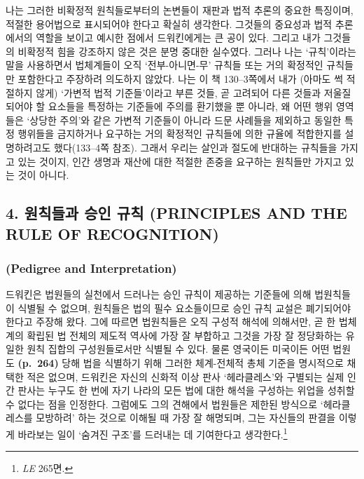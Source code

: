 나는 그러한 비확정적 원칙들로부터의 논변들이 재판과 법적 추론의 중요한
특징이며, 적절한 용어법으로 표시되어야 한다고 확실히 생각한다. 그것들의
중요성과 법적 추론에서의 역할을 보이고 예시한 점에서 드워킨에게는 큰
공이 있다. 그리고 내가 그것들의 비확정적 힘을 강조하지 않은 것은 분명
중대한 실수였다. 그러나 나는 ‘규칙’이라는 말을 사용하면서 법체계들이
오직 ‘전부-아니면-무’ 규칙들 또는 거의 확정적인 규칙들만 포함한다고
주장하려 의도하지 않았다. 나는 이 책 130--3쪽에서 내가 (아마도 썩
적절하지 않게) ‘가변적 법적 기준들’이라고 부른 것들, 곧 고려되어 다른
것들과 저울질되어야 할 요소들을 특정하는 기준들에 주의를 환기했을 뿐
아니라, 왜 어떤 행위 영역들은 ‘상당한 주의’와 같은 가변적 기준들이
아니라 드문 사례들을 제외하고 동일한 특정 행위들을 금지하거나 요구하는
거의 확정적인 규칙들에 의한 규율에 적합한지를 설명하려고도 했다(133--4쪽
참조). 그래서 우리는 살인과 절도에 반대하는 규칙들을 가지고 있는 것이지,
인간 생명과 재산에 대한 적절한 존중을 요구하는 원칙들만 가지고 있는 것이
아니다.

\subsection{4. 원칙들과 승인 규칙 (PRINCIPLES AND THE RULE OF
RECOGNITION)}\label{uxc6d0uxce59uxb4e4uxacfc-uxc2b9uxc778-uxaddcuxce59-principles-and-the-rule-of-recognition}

\subsubsection{\texorpdfstring{ (Pedigree and
Interpretation)}{계보와 해석 (Pedigree and Interpretation)}}\label{uxacc4uxbcf4uxc640-uxd574uxc11d-pedigree-and-interpretation}

드워킨은 법원들의 실천에서 드러나는 승인 규칙이 제공하는 기준들에 의해
법원칙들이 식별될 수 없으며, 원칙들은 법의 필수 요소들이므로 승인 규칙
교설은 폐기되어야 한다고 주장해 왔다. 그에 따르면 법원칙들은 오직 구성적
해석에 의해서만, 곧 한 법체계의 확립된 법 전체의 제도적 역사에 가장 잘
부합하고 그것을 가장 잘 정당화하는 유일한 원칙 집합의 구성원들로서만
식별될 수 있다. 물론 영국이든 미국이든 어떤 법원도 \textbf{(p.~264)}
당해 법을 식별하기 위해 그러한 체계-전체적 총체 기준을 명시적으로 채택한
적은 없으며, 드워킨은 자신의 신화적 이상 판사 ‘헤라클레스’와 구별되는
실제 인간 판사는 누구도 한 번에 자기 나라의 모든 법에 대한 해석을
구성하는 위업을 성취할 수 없다는 점을 인정한다. 그럼에도 그의 견해에서
법원들은 제한된 방식으로 ‘헤라클레스를 모방하려’ 하는 것으로 이해될 때
가장 잘 해명되며, 그는 자신들의 판결을 이렇게 바라보는 일이 ‘숨겨진
구조’를 드러내는 데 기여한다고 생각한다.\footnote{\emph{LE} 265면.}

